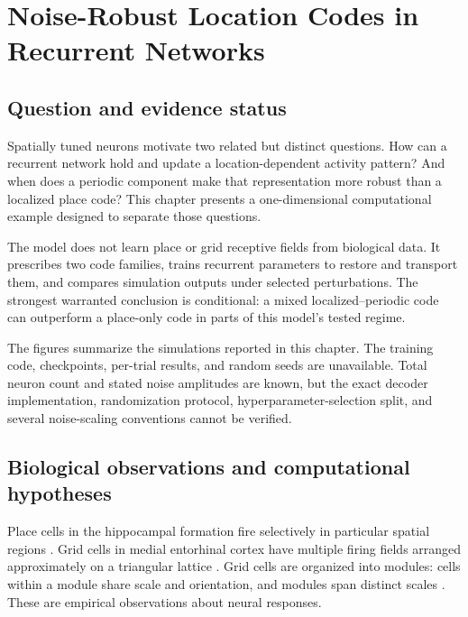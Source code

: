 \chapter{Noise-Robust Location Codes in Recurrent Networks}
\label{chap:attractor}

\section{Question and evidence status}
\label{sec:attractor-question}

Spatially tuned neurons motivate two related but distinct questions. How can a recurrent network hold and update a location-dependent activity pattern? And when does a periodic component make that representation more robust than a localized place code? This chapter presents a one-dimensional computational example designed to separate those questions.

The model does not learn place or grid receptive fields from biological data. It prescribes two code families, trains recurrent parameters to restore and transport them, and compares simulation outputs under selected perturbations. The strongest warranted conclusion is conditional: a mixed localized--periodic code can outperform a place-only code in parts of this model's tested regime.

\begin{evidencenote}
The figures summarize the simulations reported in this chapter. The training code, checkpoints, per-trial results, and random seeds are unavailable. Total neuron count and stated noise amplitudes are known, but the exact decoder implementation, randomization protocol, hyperparameter-selection split, and several noise-scaling conventions cannot be verified.
\end{evidencenote}

\section{Biological observations and computational hypotheses}
\label{sec:attractor-background}

Place cells in the hippocampal formation fire selectively in particular spatial regions \citep{oj71}. Grid cells in medial entorhinal cortex have multiple firing fields arranged approximately on a triangular lattice \citep{ht05}. Grid cells are organized into modules: cells within a module share scale and orientation, and modules span distinct scales \citep{sh12,me14}. These are empirical observations about neural responses.

